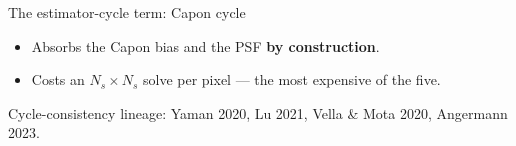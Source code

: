 \begin{frame}{The estimator-cycle term: Capon cycle}
\begin{center}
  \end{center}
  \vspace{6pt}
  \begin{itemize}
    \item Absorbs the Capon bias and the PSF \textbf{by construction}.
    \item Costs an $N_s\times N_s$ solve per pixel --- the most expensive of the five.
  \end{itemize}
  \vspace{2pt}
  {\scriptsize\color{soft} Cycle-consistency lineage: Yaman 2020, Lu 2021,
   Vella \& Mota 2020, Angermann 2023.\par}
\end{frame}

